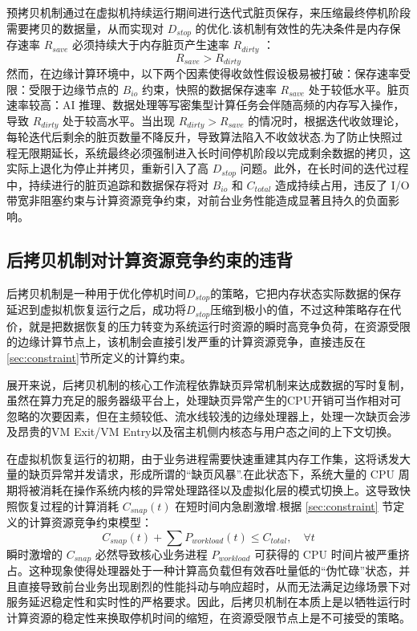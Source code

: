 预拷贝机制通过在虚拟机持续运行期间进行迭代式脏页保存，来压缩最终停机阶段需要拷贝的数据量，从而实现对 $D_{stop}$ 的优化\cite{clark2005live}.该机制有效性的先决条件是内存保存速率 $R_{save}$ 必须持续大于内存脏页产生速率 $R_{dirty}$ \cite{hines2009post}：$$
R_{save} > R_{dirty}
$$
然而，在边缘计算环境中，以下两个因素使得收敛性假设极易被打破：保存速率受限：受限于边缘节点的 $B_{io}$ 约束，快照的数据保存速率 $R_{save}$ 处于较低水平。脏页速率较高：AI 推理、数据处理等写密集型计算任务会伴随高频的内存写入操作，导致 $R_{dirty}$ 处于较高水平。当出现 $R_{dirty} > R_{save}$ 的情况时，根据迭代收敛理论，每轮迭代后剩余的脏页数量不降反升，导致算法陷入不收敛状态\cite{liu2011performance}.为了防止快照过程无限期延长，系统最终必须强制进入长时间停机阶段以完成剩余数据的拷贝，这实际上退化为停止并拷贝，重新引入了高 $D_{stop}$ 问题。此外，在长时间的迭代过程中，持续进行的脏页追踪和数据保存将对 $B_{io}$ 和 $C_{total}$ 造成持续占用，违反了 I/O 带宽非阻塞约束与计算资源竞争约束，对前台业务性能造成显著且持久的负面影响。


\subsection{后拷贝机制对计算资源竞争约束的违背}

后拷贝机制是一种用于优化停机时间$D_{stop}$的策略，它把内存状态实际数据的保存延迟到虚拟机恢复运行之后，成功将$D_{stop}$压缩到极小的值，不过这种策略存在代价，就是把数据恢复的压力转变为系统运行时资源的瞬时高竞争负荷，在资源受限的边缘计算节点上，该机制会直接引发严重的计算资源竞争，直接违反在\ref{sec:constraint}节所定义的计算约束。

展开来说，后拷贝机制的核心工作流程依靠缺页异常机制来达成数据的写时复制，虽然在算力充足的服务器级平台上，处理缺页异常产生的CPU开销可当作相对可忽略的次要因素，但在主频较低、流水线较浅的边缘处理器上，处理一次缺页会涉及昂贵的VM Exit/VM Entry以及宿主机侧内核态与用户态之间的上下文切换。

在虚拟机恢复运行的初期，由于业务进程需要快速重建其内存工作集，这将诱发大量的缺页异常并发请求，形成所谓的“缺页风暴”\cite{hines2009post}.在此状态下，系统大量的 CPU 周期将被消耗在操作系统内核的异常处理路径以及虚拟化层的模式切换上。这导致快照恢复过程的计算消耗 $C_{snap}(t)$ 在短时间内急剧激增\cite{liu2011performance}.根据 \ref{sec:constraint} 节定义的计算资源竞争约束模型：
$$
C_{snap}(t) + \sum P_{workload}(t) \le C_{total}, \quad \forall t
$$
瞬时激增的 $C_{snap}$ 必然导致核心业务进程 $P_{workload}$ 可获得的 CPU 时间片被严重挤占。这种现象使得处理器处于一种计算高负载但有效吞吐量低的“伪忙碌”状态，并且直接导致前台业务出现剧烈的性能抖动与响应超时，从而无法满足边缘场景下对服务延迟稳定性和实时性的严格要求。因此，后拷贝机制在本质上是以牺牲运行时计算资源的稳定性来换取停机时间的缩短，在资源受限节点上是不可接受的策略。


